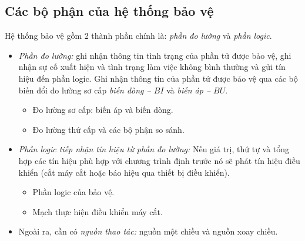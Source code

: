 \documentclass[12pt,a4paper]{article}
\begin{document}
\subsection{Các bộ phận của hệ thống bảo vệ}
	Hệ thống bảo vệ gồm 2 thành phần chính là: \emph{phần đo lường} và \emph{phần logic}.
	
	\begin{itemize}
		\item \emph{Phần đo lường:} ghi nhận thông tin tình trạng của phần tử được bảo vệ, ghi nhận sự cố xuất hiện và tình trạng làm việc không bình thường và gửi tín hiệu đến phần logic. Ghi nhận thông tin của phần tử được bảo vệ qua các bộ biến đổi đo lường sơ cấp \emph{biến dòng -- $BI$} và \emph{biến áp -- $BU$}.
			\begin{itemize}
				\item Đo lường sơ cấp: biến áp và biến dòng.
				
				\item Đo lường thứ cấp và các bộ phận so sánh.
			\end{itemize}
		
		\item \emph{Phần logic tiếp nhận tín hiệu từ phần đo lường:} Nếu giá trị, thứ tự và tổng hợp các tín hiệu phù hợp với chương trình định trước nó sẽ phát tín hiệu điều khiển (cắt máy cắt hoặc báo hiệu qua thiết bị điều khiển).
			\begin{itemize}
				\item Phần logic của bảo vệ.
				
				\item Mạch thực hiện điều khiển máy cắt.
			\end{itemize}
			
		\item Ngoài ra, cần có \emph{nguồn thao tác:} nguồn một chiều và nguồn xoay chiều.
	\end{itemize}
	
\end{document}
